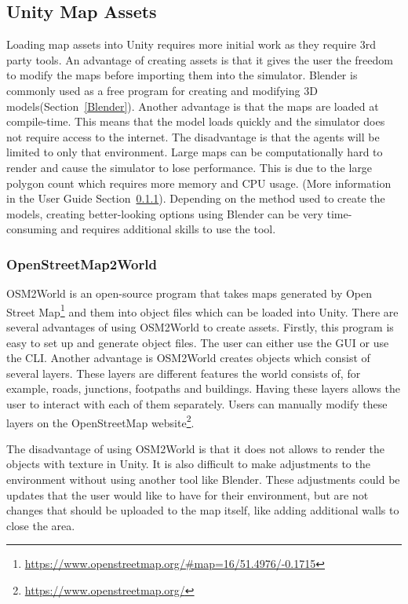 \FloatBarrier
\subsection{Unity Map Assets}
Loading map assets into Unity requires more initial work as they require 3rd party tools. An advantage of creating assets is that it gives the user the freedom to modify the maps before importing them into the simulator. Blender is commonly used as a free program for creating and modifying 3D models\cite{MendozaGuevarraEzraThess2020CGEi}(Section~\ref{Blender}). Another advantage is that the maps are loaded at compile-time. This means that the model loads quickly and the simulator does not require access to the internet. The disadvantage is that the agents will be limited to only that environment. Large maps can be computationally hard to render and cause the simulator to lose performance. This is due to the large polygon count which requires more memory and CPU usage. (More information in the User Guide Section~\ref{}). Depending on the method used to create the models, creating better-looking options using Blender can be very time-consuming and requires additional skills to use the tool. 


\subsubsection{OpenStreetMap2World}
OSM2World is an open-source program that takes maps generated by Open Street Map\footnote{\url{https://www.openstreetmap.org/\#map=16/51.4976/-0.1715}} and them into object files which can be loaded into Unity. There are several advantages of using OSM2World to create assets. Firstly, this program is easy to set up and generate object files. The user can either use the GUI or use the CLI. Another advantage is OSM2World creates objects which consist of several layers. These layers are different features the world consists of, for example, roads, junctions, footpaths and buildings. Having these layers allows the user to interact with each of them separately. Users can manually modify these layers on the OpenStreetMap website\footnote{\url{https://www.openstreetmap.org/}}.

The disadvantage of using OSM2World is that it does not allows to render the objects with texture in Unity. It is also difficult to make adjustments to the environment without using another tool like Blender. These adjustments could be updates that the user would like to have for their environment, but are not changes that should be uploaded to the map itself, like adding additional walls to close the area.

